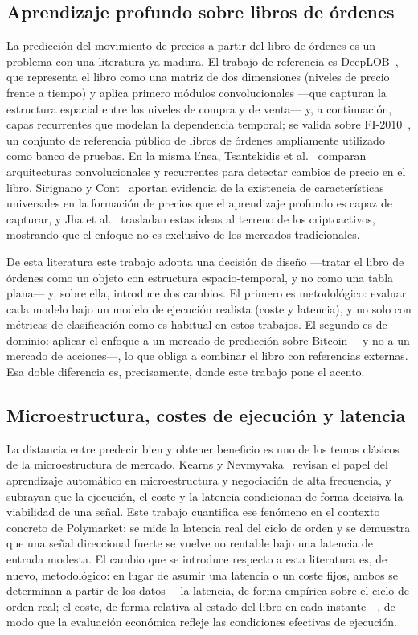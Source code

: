 \subsection{Aprendizaje profundo sobre libros de órdenes}

La predicción del movimiento de precios a partir del libro de órdenes es un problema con
una literatura ya madura. El trabajo de referencia es DeepLOB~\cite{zhang2019deeplob}, que
representa el libro como una matriz de dos dimensiones (niveles de precio frente a tiempo) y
aplica primero módulos convolucionales —que capturan la estructura espacial entre los
niveles de compra y de venta— y, a continuación, capas recurrentes que modelan la
dependencia temporal; se valida sobre FI-2010~\cite{ntakaris2018}, un conjunto de referencia
público de libros de órdenes ampliamente utilizado como banco de pruebas. En la misma línea,
Tsantekidis et al.~\cite{tsantekidis2017} comparan arquitecturas convolucionales y
recurrentes para detectar cambios de precio en el libro. Sirignano y
Cont~\cite{sirignano2019universal} aportan evidencia de la existencia de características
universales en la formación de precios que el aprendizaje profundo es capaz de capturar, y
Jha et al.~\cite{jha2020digital} trasladan estas ideas al terreno de los criptoactivos,
mostrando que el enfoque no es exclusivo de los mercados tradicionales.

De esta literatura este trabajo adopta una decisión de diseño —tratar el libro de órdenes
como un objeto con estructura espacio-temporal, y no como una tabla plana— y, sobre ella,
introduce dos cambios. El primero es metodológico: evaluar cada modelo bajo un modelo de
ejecución realista (coste y latencia), y no solo con métricas de clasificación como es
habitual en estos trabajos. El segundo es de dominio: aplicar el enfoque a un mercado de
predicción sobre Bitcoin —y no a un mercado de acciones—, lo que obliga a combinar el libro
con referencias externas. Esa doble diferencia es, precisamente, donde este trabajo pone el
acento.

\subsection{Microestructura, costes de ejecución y latencia}

La distancia entre predecir bien y obtener beneficio es uno de los temas clásicos de la
microestructura de mercado. Kearns y Nevmyvaka~\cite{kearns2013} revisan el papel del
aprendizaje automático en microestructura y negociación de alta frecuencia, y subrayan que
la ejecución, el coste y la latencia condicionan de forma decisiva la viabilidad de una
señal. Este trabajo cuantifica ese fenómeno en el contexto concreto de Polymarket: se mide
la latencia real del ciclo de orden y se demuestra que una señal direccional fuerte se
vuelve no rentable bajo una latencia de entrada modesta. El cambio que se introduce respecto
a esta literatura es, de nuevo, metodológico: en lugar de asumir una latencia o un coste
fijos, ambos se determinan a partir de los datos —la latencia, de forma empírica sobre el
ciclo de orden real; el coste, de forma relativa al estado del libro en cada instante—, de
modo que la evaluación económica refleje las condiciones efectivas de ejecución.

